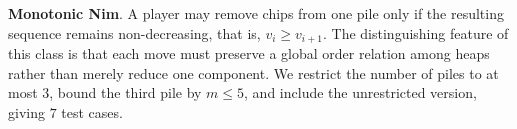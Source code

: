 \documentclass[review]{elsarticle}
\newcommand{\set}[1]{\{ #1 \}}
\newcommand{\tuple}[1]{\langle {#1} \rangle}
\newcommand{\true}{\top}
\newcommand{\statevar}{\mathcal{X}}
\newcommand{\act}{\mathcal{A}}
\newcommand{\constraint}{\mathcal{C}}
\newcommand{\estate}{\mathcal{E}}
\newcommand{\pre}{\mathtt{pre}}
\newcommand{\eff}{\mathtt{eff}}
\begin{document}
{\color{red}\textbf{Monotonic Nim}. A player may remove chips from one pile only if the resulting sequence remains non-decreasing, that is, $v_i \ge v_{i+1}$.}
{\color{red}The distinguishing feature of this class is that each move must preserve a global order relation among heaps rather than merely reduce one component.}
{\color{red}We restrict the number of piles to at most $3$, bound the third pile by $m \le 5$, and include the unrestricted version, giving $7$ test cases.}
\end{document}
